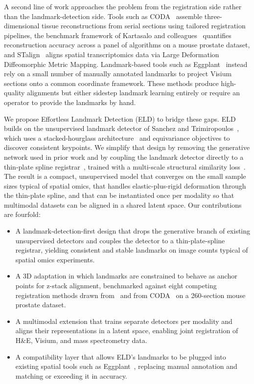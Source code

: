 A second line of work approaches the problem from the registration side rather than the landmark-detection side. Tools such as CODA~\cite{kiemen2022coda} assemble three-dimensional tissue reconstructions from serial sections using tailored registration pipelines, the benchmark framework of Kartasalo and colleagues~\cite{kartasalo2018comparative} quantifies reconstruction accuracy across a panel of algorithms on a mouse prostate dataset, and STalign~\cite{clifton2023stalign} aligns spatial transcriptomics data via Large Deformation Diffeomorphic Metric Mapping. Landmark-based tools such as Eggplant~\cite{bergenstrahle2021eggplant} instead rely on a small number of manually annotated landmarks to project Visium sections onto a common coordinate framework. These methods produce high-quality alignments but either sidestep landmark learning entirely or require an operator to provide the landmarks by hand.

We propose Effortless Landmark Detection (ELD) to bridge these gaps. ELD builds on the unsupervised landmark detector of Sanchez and Tzimiropoulos~\cite{sanchez2019object}, which uses a stacked-hourglass architecture~\cite{newell2016stacked} and equivariance objectives to discover consistent keypoints. We simplify that design by removing the generative network used in prior work and by coupling the landmark detector directly to a thin-plate spline registrar~\cite{bookstein1989principal,keller2020thinplate}, trained with a multi-scale structural similarity loss~\cite{wang2003multiscale,wang2004image}. The result is a compact, unsupervised model that converges on the small sample sizes typical of spatial omics, that handles elastic-plus-rigid deformation through the thin-plate spline, and that can be instantiated once per modality so that multimodal datasets can be aligned in a shared latent space. Our contributions are fourfold:
\begin{itemize}
  \item A landmark-detection-first design that drops the generative branch of existing unsupervised detectors and couples the detector to a thin-plate-spline registrar, yielding consistent and stable landmarks on image counts typical of spatial omics experiments.
  \item A 3D adaptation in which landmarks are constrained to behave as anchor points for z-stack alignment, benchmarked against eight competing registration methods drawn from~\cite{kartasalo2018comparative} and from CODA~\cite{kiemen2022coda} on a 260-section mouse prostate dataset.
  \item A multimodal extension that trains separate detectors per modality and aligns their representations in a latent space, enabling joint registration of H\&E, Visium, and mass spectrometry data.
  \item A compatibility layer that allows ELD's landmarks to be plugged into existing spatial tools such as Eggplant~\cite{bergenstrahle2021eggplant}, replacing manual annotation and matching or exceeding it in accuracy.
\end{itemize}

